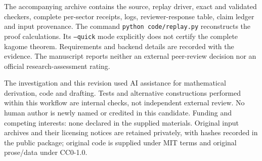 \documentclass[11pt,a4paper]{article}
\theoremstyle{remark}\newtheorem{remark}[theorem]{Remark}
\begin{document}
The accompanying archive contains the source, replay driver, exact and validated checkers, complete per-sector receipts, logs, reviewer-response table, claim ledger and input provenance. The command \texttt{python code/replay.py} reconstructs the proof calculations. Its \texttt{--quick} mode explicitly does not certify the complete kagome theorem. Requirements and backend details are recorded with the evidence. The manuscript reports neither an external peer-review decision nor an official research-assessment rating.

The investigation and this revision used AI assistance for mathematical derivation, code and drafting. Tests and alternative constructions performed within this workflow are internal checks, not independent external review. No human author is newly named or credited in this candidate. Funding and competing interests: none declared in the supplied materials. Original input archives and their licensing notices are retained privately, with hashes recorded in the public package; original code is supplied under MIT terms and original prose/data under CC0-1.0.

\appendix
\end{document}
